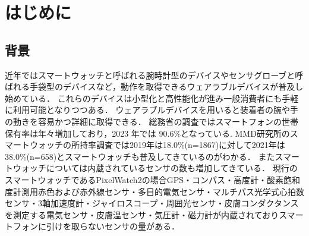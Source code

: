 \chapter{はじめに}
\section{背景}
近年ではスマートウォッチと呼ばれる腕時計型のデバイスやセンサグローブと呼ばれる手袋型のデバイスなど，動作を取得できるウェアラブルデバイスが普及し始めている．
これらのデバイスは小型化と高性能化が進み一般消費者にも手軽に利用可能となりつつある．
ウェアラブルデバイスを用いると装着者の腕や手の動きを容易かつ詳細に取得できる．
総務省の調査\cite{情報通信白書}ではスマートフォンの世帯保有率は年々増加しており，2023 年では 90.6\%となっている.
MMD研究所のスマートウォッチの所持率調査では2019年\cite{ウォッチ2019}は18.0\%(n=1867)に対して2021年\cite{ウォッチ2021}は38.0\%(n=658)とスマートウォッチも普及してきているのがわかる．
またスマートウォッチについては内蔵されているセンサの数も増加してきている．
現行のスマートウォッチであるPixelWatch2の場合GPS・コンパス・高度計・酸素飽和度計測用赤色および赤外線センサ・多目的電気センサ・マルチパス光学式心拍数センサ・3軸加速度計・ジャイロスコープ・周囲光センサ・皮膚コンダクタンスを測定する電気センサ・皮膚温センサ・気圧計・磁力計が内蔵されておりスマートフォンに引けを取らないセンサの量がある．

